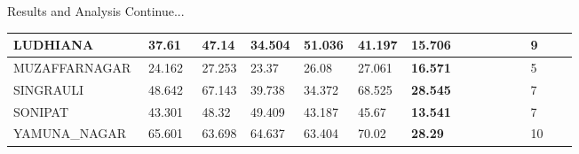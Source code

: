 \documentclass[12pt, aspectratio=169]{beamer}
\begin{document}
\begin{frame}{Results and Analysis \tiny{Continue...}}
\begin{table}
\begin{tabular}[c]{|p{0.165\linewidth}|p{0.096\linewidth}|p{0.044\linewidth}|p{0.044\linewidth}|p{0.06\linewidth}|p{0.044\linewidth}|p{0.206\linewidth}|p{0.08\linewidth}|}
		LUDHIANA       & 37.61        & 47.14     & 34.504    & 51.036     & 41.197    & \textbf{15.706} & 9      \\ \hline
		MUZAFFARNAGAR  & 24.162       & 27.253    & 23.37     & 26.08      & 27.061    & \textbf{16.571} & 5      \\ \hline
		SINGRAULI      & 48.642       & 67.143    & 39.738    & 34.372     & 68.525    & \textbf{28.545} & 7      \\ \hline
		SONIPAT        & 43.301       & 48.32     & 49.409    & 43.187     & 45.67     & \textbf{13.541} & 7      \\ \hline
		YAMUNA\_NAGAR  & 65.601       & 63.698    & 64.637    & 63.404     & 70.02     & \textbf{28.29}  & 10    \\ \hline
		\end{tabular}
	\end{table}
\end{frame}
\end{document}
